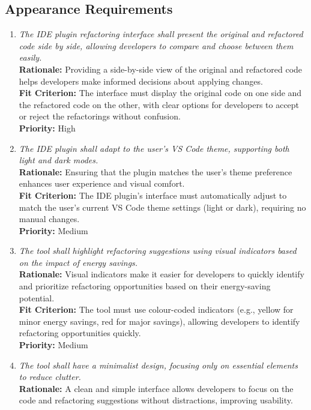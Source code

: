\documentclass[12pt]{article}
\begin{document}
\subsection{Appearance Requirements}
\begin{enumerate}[label=LFR-AP \arabic*., wide=0pt, leftmargin=*]
    \item \emph{The IDE plugin refactoring interface shall present the original and refactored code side by side, allowing developers to compare and choose between them easily.}\\[2mm]
    {\bf Rationale:} Providing a side-by-side view of the original and refactored code helps developers make informed decisions about applying changes.\\
    {\bf Fit Criterion:} The interface must display the original code on one side and the refactored code on the other, with clear options for developers to accept or reject the refactorings without confusion.\\
    {\bf Priority:} High
    \item \emph{The IDE plugin shall adapt to the user’s VS Code theme, supporting both light and dark modes.}\\[2mm]
    {\bf Rationale:} Ensuring that the plugin matches the user's theme preference enhances user experience and visual comfort.\\
    {\bf Fit Criterion:} The IDE plugin’s interface must automatically adjust to match the user’s current VS Code theme settings (light or dark), requiring no manual changes.\\
    {\bf Priority:} Medium
    \item \emph{The tool shall highlight refactoring suggestions using visual indicators based on the impact of energy savings.}\\[2mm]
    {\bf Rationale:} Visual indicators make it easier for developers to quickly identify and prioritize refactoring opportunities based on their energy-saving potential.\\
    {\bf Fit Criterion:} The tool must use colour-coded indicators (e.g., yellow for minor energy savings, red for major savings), allowing developers to identify refactoring opportunities quickly.\\
    {\bf Priority:} Medium
    \item \emph{The tool shall have a minimalist design, focusing only on essential elements to reduce clutter.}\\[2mm]
    {\bf Rationale:} A clean and simple interface allows developers to focus on the code and refactoring suggestions without distractions, improving usability.\\

\end{enumerate}
\end{document}
